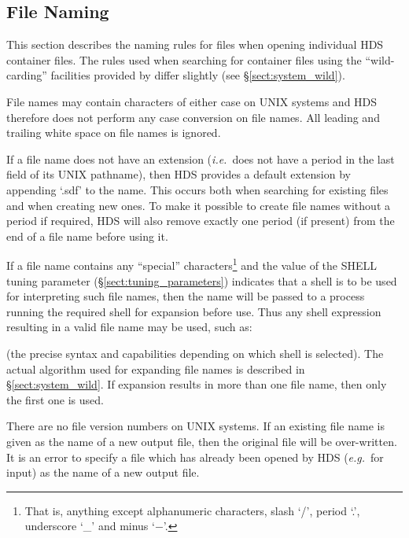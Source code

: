 \documentclass[twoside,11pt]{starlink}
\providecommand{\qt}[1]{``#1''}
\providecommand{\st}[1]{{\emph{#1}}}
\begin{document}
\subsection{\label{sect:system_files}File Naming}

This section describes the naming rules for files when opening
individual HDS container files. The rules used when searching for
container files using the \qt{wild-carding} facilities provided by
 differ slightly (see \S\ref{sect:system_wild}).

File names may contain characters of either case on UNIX systems and
HDS therefore does not perform any case conversion on file names. All
leading and trailing white space on file names is ignored.

If a file name does not have an extension (\st{i.e.}\ does not have a
period in the last field of its UNIX pathname), then HDS provides a
default extension by appending `.sdf' to the name. This occurs both
when searching for existing files and when creating new ones. To make
it possible to create file names without a period if required, HDS
will also remove exactly one period (if present) from the end of a
file name before using it.

If a file name contains any \qt{special} characters\footnote{That is,
anything except alphanumeric characters, slash `/', period `.',
underscore `\_' and minus `$-$'.} and the value of the SHELL tuning
parameter (\S\ref{sect:tuning_parameters}) indicates that a shell is
to be used for interpreting such file names, then the name will be
passed to a process running the required shell for expansion before
use. Thus any shell expression resulting in a valid file name may be
used, such as:

\begin{small}
\end{small}

(the precise syntax and capabilities depending on which shell is
selected). The actual algorithm used for expanding file names is
described in \S\ref{sect:system_wild}. If expansion results in more
than one file name, then only the first one is used.

There are no file version numbers on UNIX systems. If an existing file
name is given as the name of a new output file, then the original file
will be over-written. It is an error to specify a file which has
already been opened by HDS (\st{e.g.}\ for input) as the name of a
new output file.
\end{document}
